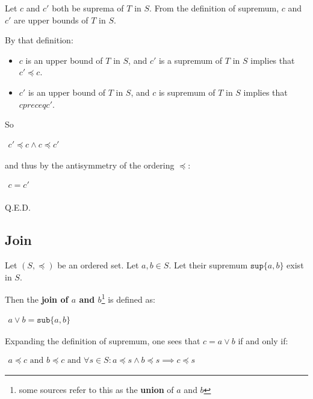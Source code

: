 Let $c$ and $c'$ both be suprema of $T$ in $S$. From the definition of
supremum, $c$ and $c'$ are upper bounds of $T$ in $S$.

By that definition:

\begin{itemize}
\item $c$ is an upper bound of $T$ in $S$, and $c'$ is a supremum of $T$ in $S$ implies that $c' \preceq c$.
\item $c'$ is an upper bound of $T$ in $S$, and $c$ is supremum of $T$ in $S$ implies that $c preceq c'$.
\end{itemize}


So

\begin{math}
  \begin{array}{c}
    c' \preceq c \land c \preceq c'
  \end{array}
\end{math}

and thus by the antisymmetry of the ordering $\preceq$:

\begin{math}
  \begin{array}{c}
    c = c' \\
  \end{array}
\end{math}

Q.E.D.


\subsection{Join}
\label{sec:join}

Let $(S, \preceq)$ be an ordered set. Let $a, b \in S$. Let their
supremum $\mathtt{sup} \{a, b\}$ exist in $S$.

Then the \textbf{join of $a$ and $b$}\footnote{some sources refer to
  this as the \textbf{union} of $a$ and $b$} is defined as:

\begin{math}
  \begin{array}{c}
    a \vee b = \mathtt{sub} \{ a, b \}
  \end{array}
\end{math}

Expanding the definition of supremum, one sees that $c = a \vee b$ if
and only if:

\begin{math}
  \begin{array}{c}
    a \preceq c\text{ and }b \preceq c\text{ and }\forall s \in S: a \preceq s \land b \preceq s \implies c \preceq s
  \end{array}
\end{math}



